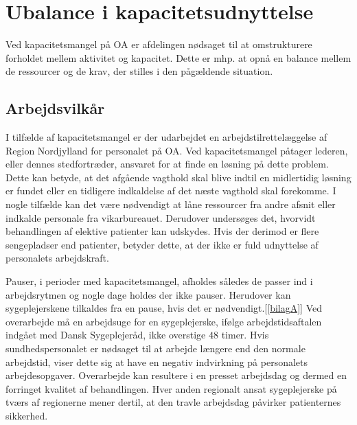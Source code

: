 
\section{Ubalance i kapacitetsudnyttelse}
Ved kapacitetsmangel på OA er afdelingen nødsaget til at omstrukturere forholdet mellem aktivitet og kapacitet. Dette er mhp. at opnå en balance mellem de ressourcer og de krav, der stilles i den pågældende situation.\cite{Bjerg2016} %

\subsection{Arbejdsvilkår} \label{Per_sik}

I tilfælde af kapacitetsmangel er der udarbejdet en arbejdstilrettelæggelse af Region Nordjylland for personalet på OA. Ved kapacitetsmangel påtager lederen, eller dennes stedfortræder, ansvaret for at finde en løsning på dette problem. Dette kan betyde, at det afgående vagthold skal blive indtil en midlertidig løsning er fundet eller en tidligere indkaldelse af det næste vagthold skal forekomme. I nogle tilfælde kan det være nødvendigt at låne ressourcer fra andre afsnit eller indkalde personale fra vikarbureauet. Derudover undersøges det, hvorvidt behandlingen af elektive patienter kan udskydes.\cite{Bjerg2016} 
Hvis der derimod er flere sengepladser end patienter, betyder dette, at der ikke er fuld udnyttelse af personalets arbejdskraft.

Pauser, i perioder med kapacitetsmangel, afholdes således de passer ind i arbejdsrytmen og nogle dage holdes der ikke pauser. Herudover kan sygeplejerskene tilkaldes fra en pause, hvis det er nødvendigt.[\ref{bilagA}] Ved overarbejde må en arbejdsuge for en sygeplejerske, ifølge arbejdstidsaftalen indgået med Dansk Sygeplejeråd, ikke overstige $48$ timer. Hvis sundhedspersonalet er nødsaget til at arbejde længere end den normale arbejdstid, viser dette sig at have en negativ indvirkning på personalets arbejdesopgaver\cite{Dinges2004}. Overarbejde kan resultere i en presset arbejdsdag og dermed en forringet kvalitet af behandlingen. Hver anden regionalt ansat sygeplejerske på tværs af regionerne mener dertil, at den travle arbejdsdag påvirker patienternes sikkerhed.\cite{Kjeldsen2015}


